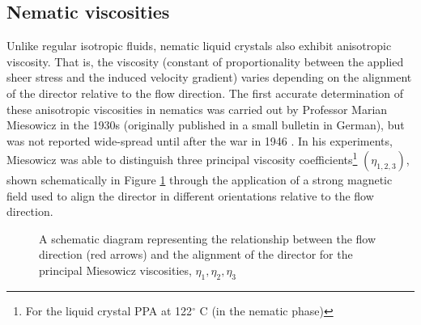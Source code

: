 \subsection{Nematic viscosities}
Unlike regular isotropic fluids, nematic liquid crystals also exhibit anisotropic viscosity. That is, the viscosity (constant of proportionality between the applied sheer stress and the induced velocity gradient) varies depending on the alignment of the director relative to the flow direction.
The first accurate determination of these anisotropic viscosities in nematics was carried out by Professor Marian Miesowicz in the 1930s (originally published in a small bulletin in German), but was not reported wide-spread until after the war in 1946 \cite{Miesowicz1946}. In his experiments, Miesowicz was able to distinguish three principal viscosity coefficients\footnote{For the liquid crystal PPA at 122$^{\circ}$ C (in the nematic phase)} $\left(\eta_{1,2,3}\right)$, shown schematically in Figure \ref{fig:eta} through the application of a strong magnetic field used to align the director in different orientations relative to the flow direction.

\begin{figure}
\begin{center}
\end{center}
\caption[Caption]{\label{fig:eta}A schematic diagram representing the relationship between the flow direction (red arrows) and the alignment of the director for the principal Miesowicz viscosities, $\eta_1,\eta_2,\eta_3$}
\end{figure}

